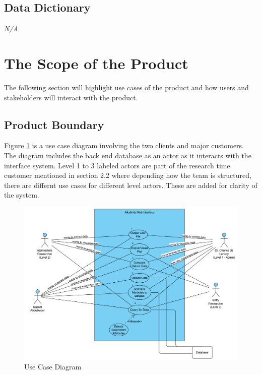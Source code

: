 \documentclass[12pt]{article}
\begin{document}
\subsection{Data Dictionary}
\emph{N/A}

\section{The Scope of the Product}
The following section will highlight use cases of the product and how users and
stakeholders will interact with the product.  
\subsection{Product Boundary}
Figure \ref{UCD} is a use case diagram involving the two clients and major customers. The
diagram includes the back end database as an actor as it interacts with the
interface system. Level 1 to 3 labeled actors are part of the research time
customer mentioned in section 2.2 where depending how the team is structured,
there are differnt use cases for different level actors. These are added for
clarity of the system.

\begin{figure}[H]
  \centering
  \includegraphics[scale=0.5]{capstoneUseCase.png}
  \caption{Use Case Diagram}
  \label{UCD}
\end{figure}
\end{document}
